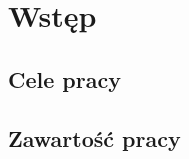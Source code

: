 \chapter{Wstęp}
\label{cha:wprowadzenie}




\section{Cele pracy}
\label{sec:celePracy}





\section{Zawartość pracy}
\label{sec:zawartoscPracy}
